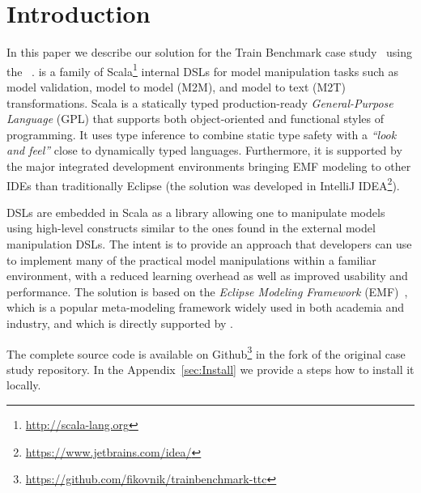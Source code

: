

\section{Introduction}
\label{sec:Introduction}

In this paper we describe our solution for the \TTC Train Benchmark case study~\cite{Szarnyas2015} using the \SIGMA~\cite{Krikava2014}.
\SIGMA is a family of Scala\footnote{\url{http://scala-lang.org}} internal DSLs for model manipulation tasks such as model validation, model to model (M2M), and model to text (M2T) transformations.
Scala is a statically typed production-ready \emph{General-Purpose Language} (GPL) that supports both object-oriented and functional styles of programming.
It uses type inference to combine static type safety with a \emph{``look and feel''} close to dynamically typed languages.
Furthermore, it is supported by the major integrated development environments bringing EMF modeling to other IDEs than traditionally Eclipse (the solution was developed in IntelliJ IDEA\footnote{\url{https://www.jetbrains.com/idea/}}).

\SIGMA DSLs are embedded in Scala as a library allowing one to manipulate models using high-level constructs similar to the ones found in the external model manipulation DSLs.
The intent is to provide an approach that developers can use to implement many of the practical model manipulations within a familiar environment, with a reduced learning overhead as well as improved usability and performance.
The solution is based on the \emph{Eclipse Modeling Framework} (EMF)~\cite{EMF}, which is a popular meta-modeling framework widely used in both academia and industry, and which is directly supported by \SIGMA.

The complete source code is available on Github\footnote{\url{https://github.com/fikovnik/trainbenchmark-ttc}} in the fork of the original case study repository.
In the Appendix~\ref{sec:Install} we provide a steps how to install it locally.